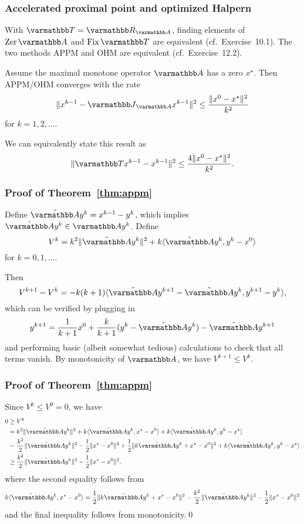 \documentclass[10pt,mathserif]{beamer}
\begin{document}
\begin{frame}
\frametitle{Accelerated proximal point and optimized Halpern}

With $\opT=\opR_\opA$, finding elements of $\zer \opA$ and $\fix \opT$ are equivalent (cf.\ Exercise~10.1).
The two methods APPM and OHM are equivalent (cf.\ Exercise~12.2).

\begin{theorem}
\label{thm:appm}
Assume the maximal monotone operator $\opA$ has a zero $x^\star$.
Then APPM/OHM converges with the rate
\[
\|x^{k-1}-\opJ_\opA x^{k-1}\|^2\le \frac{\|x^0-x^\star\|^2}{k^2}
\]
for $k=1,2,\dots$.
\end{theorem}
\vspace{0.2in}

We can equivalently state this result as
\[
\|\opT x^{k-1}-x^{k-1}\|^2\le \frac{4\|x^0-x^\star\|^2}{k^2}.
\]
\end{frame}

\begin{frame}
\frametitle{Proof of Theorem~\ref{thm:appm}}
Define $\tilde{\opA}y^k=x^{k-1}-y^k$, which implies $\tilde{\opA}y^k\in \opA y^k$.
Define
\[
V^k=k^2\|\tilde{\opA}y^k\|^2+k\langle \tilde{\opA}y^k,y^k-x^0\rangle
\]
for $k=0,1,\dots$.

\vspace{0.2in}

Then
\[
V^{k+1}- V^k=-k(k+1)\langle \tilde{\opA}y^{k+1}-\tilde{\opA}y^k,y^{k+1}-y^k\rangle,
\]
which can be verified by plugging in 
\[
y^{k+1}=\frac{1}{k+1}x^0+\frac{k}{k+1}(y^k-\tilde{\opA}y^k)-\tilde{\opA}y^{k+1}
\]
and performing basic (albeit somewhat tedious) calculations to check that all terms vanish.
By monotonicity of $\opA$, we have $V^{k+1}\le V^k$.
\end{frame}

\begin{frame}
\frametitle{Proof of Theorem~\ref{thm:appm}}

Since $V^k\le V^0=0$, we have
\begin{align*}
0&\ge V^k\\
&=k^2\|\tilde{\opA}y^k\|^2+k\langle \tilde{\opA}y^k,x^\star-x^0\rangle+k\langle \tilde{\opA}y^k,y^k-x^\star\rangle\\
&=
\frac{k^2}{2}\|\tilde{\opA}y^k\|^2
-\frac{1}{2}\|x^\star-x^0\|^2
+\frac{1}{2}\|k\tilde{\opA}y^k+x^\star-x^0\|^2
+
k\langle \tilde{\opA}y^k,y^k-x^\star\rangle\\
&\ge
\frac{k^2}{2}\|\tilde{\opA}y^k\|^2
-\frac{1}{2}\|x^\star-x^0\|^2,
\end{align*}
where the second equality follows from
\[
k\langle \tilde{\opA}y^k,x^\star-x^0\rangle
=
\frac{1}{2}\|k\tilde{\opA}y^k+x^\star-x^0\|^2
-
\frac{k^2}{2}\| \tilde{\opA}y^k\|^2
-\frac{1}{2}\|x^\star-x^0\|^2
\]
 and the final inequality follows from monotonicity.\qed
 \end{frame}
 
\end{document}
